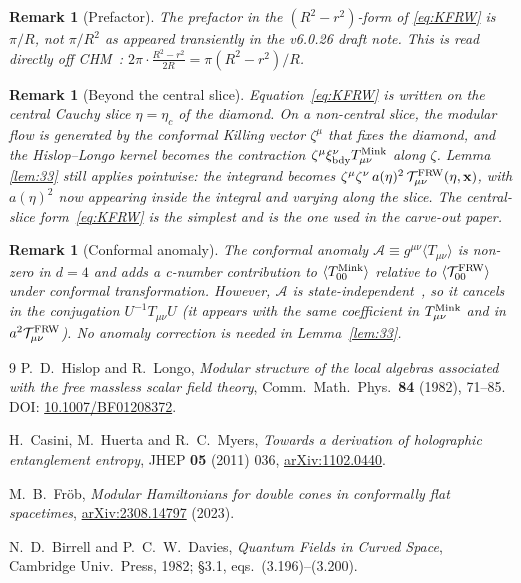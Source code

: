 \documentclass[11pt]{article}
\newtheorem{remark}[lemma]{Remark}
\begin{document}
\begin{remark}[Prefactor]\label{rem:pref}
The prefactor in the $(R^2-r^2)$-form of \eqref{eq:KFRW} is $\pi/R$, not
$\pi/R^2$ as appeared transiently in the v6.0.26 draft note.  This is read
directly off CHM~\cite[eq.~(2.20)]{CasiniHuertaMyers2011}: $2\pi\cdot\frac{R^2-r^2}{2R}=\pi(R^2-r^2)/R$.
\end{remark}

\begin{remark}[Beyond the central slice]\label{rem:beyond}
Equation~\eqref{eq:KFRW} is written on the \emph{central} Cauchy slice
$\eta=\eta_c$ of the diamond.  On a non-central slice, the modular flow
is generated by the conformal Killing vector $\zeta^\mu$ that fixes the
diamond, and the Hislop--Longo kernel becomes the contraction
$\zeta^\mu\xi^\nu_{\rm bdy}T^{\rm Mink}_{\mu\nu}$ along $\zeta$.  Lemma
\ref{lem:33} still applies pointwise: the integrand becomes
$\zeta^\mu\zeta^\nu\,a(\eta)^{2}\,\mathcal{T}^{\rm FRW}_{\mu\nu}(\eta,\mathbf{x})$,
with $a(\eta)^2$ now appearing inside the integral and varying along the
slice.  The central-slice form~\eqref{eq:KFRW} is the simplest and is the
one used in the carve-out paper.
\end{remark}

\begin{remark}[Conformal anomaly]\label{rem:anomaly}
The conformal anomaly $\mathcal{A}\equiv g^{\mu\nu}\langle T_{\mu\nu}\rangle$
is non-zero in $d=4$ and adds a c-number contribution to $\langle
T^{\rm Mink}_{00}\rangle$ relative to $\langle\mathcal{T}^{\rm FRW}_{00}\rangle$
under conformal transformation.  However, $\mathcal{A}$ is
\emph{state-independent}~\cite[\S3.5]{Frob2023}, so it cancels in the
\emph{conjugation} $U^{-1}T_{\mu\nu}U$ (it appears with the same
coefficient in $T_{\mu\nu}^{\rm Mink}$ and in $a^2\mathcal{T}^{\rm
FRW}_{\mu\nu}$).  No anomaly correction is needed in
Lemma~\ref{lem:33}.
\end{remark}

\begin{thebibliography}{9}
P.~D.\ Hislop and R.\ Longo,
\emph{Modular structure of the local algebras associated with the free
massless scalar field theory},
Comm.\ Math.\ Phys.\ \textbf{84} (1982), 71--85.
DOI: \href{https://doi.org/10.1007/BF01208372}{10.1007/BF01208372}.

H.\ Casini, M.\ Huerta and R.~C.\ Myers,
\emph{Towards a derivation of holographic entanglement entropy},
JHEP \textbf{05} (2011) 036, \href{https://arxiv.org/abs/1102.0440}{arXiv:1102.0440}.

M.~B.\ Fr\"ob,
\emph{Modular Hamiltonians for double cones in conformally flat
spacetimes},
\href{https://arxiv.org/abs/2308.14797}{arXiv:2308.14797} (2023).

N.~D.\ Birrell and P.~C.~W.\ Davies,
\emph{Quantum Fields in Curved Space},
Cambridge Univ.\ Press, 1982; \S 3.1, eqs.~(3.196)--(3.200).
\end{thebibliography}
\end{document}
